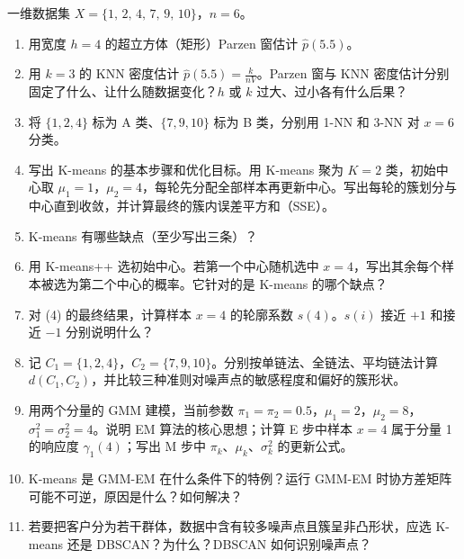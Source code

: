 一维数据集 $X=\{1,\,2,\,4,\,7,\,9,\,10\}$，$n=6$。
\begin{enumerate}[label=(\arabic*)]
\item 用宽度 $h=4$ 的超立方体（矩形）Parzen 窗估计 $\hat p(5.5)$。
\item 用 $k=3$ 的 KNN 密度估计 $\hat p(5.5)=\frac{k}{nV}$。Parzen 窗与 KNN 密度估计分别固定了什么、让什么随数据变化？$h$ 或 $k$ 过大、过小各有什么后果？
\item 将 $\{1,2,4\}$ 标为 A 类、$\{7,9,10\}$ 标为 B 类，分别用 1-NN 和 3-NN 对 $x=6$ 分类。
\item 写出 K-means 的基本步骤和优化目标。用 K-means 聚为 $K=2$ 类，初始中心取 $\mu_1=1$，$\mu_2=4$，每轮先分配全部样本再更新中心。写出每轮的簇划分与中心直到收敛，并计算最终的簇内误差平方和（SSE）。
\item K-means 有哪些缺点（至少写出三条）？
\item 用 K-means++ 选初始中心。若第一个中心随机选中 $x=4$，写出其余每个样本被选为第二个中心的概率。它针对的是 K-means 的哪个缺点？
\item 对 (4) 的最终结果，计算样本 $x=4$ 的轮廓系数 $s(4)$。$s(i)$ 接近 $+1$ 和接近 $-1$ 分别说明什么？
\item 记 $C_1=\{1,2,4\}$，$C_2=\{7,9,10\}$。分别按单链法、全链法、平均链法计算 $d(C_1,C_2)$，并比较三种准则对噪声点的敏感程度和偏好的簇形状。
\item 用两个分量的 GMM 建模，当前参数 $\pi_1=\pi_2=0.5$，$\mu_1=2$，$\mu_2=8$，$\sigma_1^2=\sigma_2^2=4$。说明 EM 算法的核心思想；计算 E 步中样本 $x=4$ 属于分量 1 的响应度 $\gamma_1(4)$；写出 M 步中 $\pi_k$、$\mu_k$、$\sigma_k^2$ 的更新公式。
\item K-means 是 GMM-EM 在什么条件下的特例？运行 GMM-EM 时协方差矩阵可能不可逆，原因是什么？如何解决？
\item 若要把客户分为若干群体，数据中含有较多噪声点且簇呈非凸形状，应选 K-means 还是 DBSCAN？为什么？DBSCAN 如何识别噪声点？
\end{enumerate}

